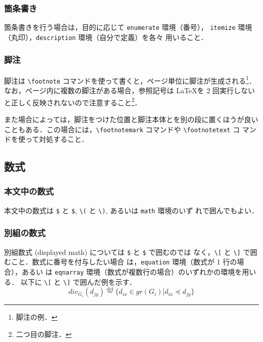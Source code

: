\documentclass[a4j]{matsushita-zemi}
\begin{document}
\subsubsection{箇条書き}

箇条書きを行う場合は，目的に応じて \verb|enumerate| 環境（番号），
\verb|itemize| 環境（丸印），\verb|description| 環境（自分で定義）を各々
用いること．


\subsubsection{脚注}

脚注は \verb|\footnote| コマンドを使って書くと，ページ単位に脚注が生成される\footnote{脚注の例．}．
なお，ページ内に複数の脚注がある場合，参照記号は \LaTeX を 2 回実行しない
と正しく反映されないので注意すること\footnote{二つ目の脚注．}．
 
また場合によっては，脚注をつけた位置と脚注本体とを別の段に置くほうが良い
こともある．この場合には，\verb|\footnotemark| コマンドや \verb|\footnotetext| コ
マンドを使って対処すること．

\subsection{数式}\label{sec:Item}

\subsubsection{本文中の数式}

本文中の数式は \verb|$| と \verb|$|, \verb|\(| と \verb|\)|, あるいは \verb|math| 環境のいず
れで囲んでもよい．

\subsubsection{別組の数式}

別組数式 (displayed math) については \verb|$| と \verb|$| で囲むのでは
なく，\verb|\[| と \verb|\]| で囲むこと．数式に番号を付与したい場合
は，\verb|equation| 環境（数式が 1 行の場合），あるい
は \verb|eqnarray| 環境（数式が複数行の場合）のいずれかの環境を用いる．
以下に \verb|\[| と \verb|\]| で囲んだ例を示す．
\[
\mathit{div}_{G_i}(d_{jy}) 
\stackrel{\mathrm{def}}{=}\{d_{ix} \in \mathit{gr}(G_i) | d_{ix} \preceq d_{jy}\}
\]
\end{document}
